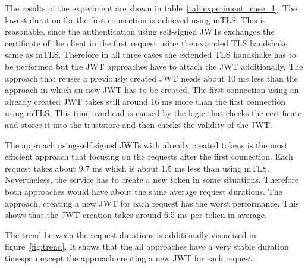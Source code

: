 The results of the experiment are shown in table~\ref{tab:experiment_case_1}.
The lowest duration for the first connection is achieved using mTLS.
This is reasonable, since the authentication using self-signed JWTs exchanges the certificate of the client in the first request using the extended TLS handshake same as mTLS.
Therefore in all three cases the extended TLS handshake has to be performed but the JWT approaches have to attach the JWT additionally.
The approach that reuses a previously created JWT needs about 10 ms less than the approach in which an new JWT has to be created.
The first connection using an already created JWT takes still around 16 ms more than the first connection using mTLS.
This time overhead is caused by the logic that checks the certificate and stores it into the truststore and then checks the validity of the JWT.

The approach using-self signed JWTs with already created tokens is the most efficient approach that focusing on the requests after the first connection.
Each request takes about 9.7 ms which is about 1.5 ms less than using mTLS.
Nevertheless, the service has to create a new token in some situations. 
Therefore both approaches would have about the same average request durations.
The approach, creating a new JWT for each request has the worst performance.
This shows that the JWT creation takes around 6.5 ms per token in average.

The trend between the request durations is additionally visualized in figure~\ref{fig:trend}.
It shows that the all approaches have a very stable duration timespan except the approach creating a new JWT for each request.

